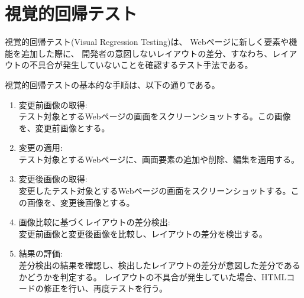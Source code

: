 \section{視覚的回帰テスト}\label{sec:vrt}
視覚的回帰テスト(Visual Regression Testing)\cite{VisualRegressionTesting}は、
Webページに新しく要素や機能を追加した際に、
開発者の意図しないレイアウトの差分、すなわち、レイアウトの不具合が発生していないことを確認するテスト手法である。
\par
視覚的回帰テストの基本的な手順は、以下の通りである。
\begin{enumerate}
      \setlength{\itemsep}{0pt}
            \setlength{\parsep}{0pt}
      \item 変更前画像の取得:\\
            テスト対象とするWebページの画面をスクリーンショットする。この画像を、変更前画像とする。
      \item 変更の適用:\\
            テスト対象とするWebページに、画面要素の追加や削除、編集を適用する。
      \item 変更後画像の取得:\\
            変更したテスト対象とするWebページの画面をスクリーンショットする。この画像を、変更後画像とする。
      \item 画像比較に基づくレイアウトの差分検出:\\
            変更前画像と変更後画像を比較し、レイアウトの差分を検出する。
      \item 結果の評価:\\
            差分検出の結果を確認し、検出したレイアウトの差分が意図した差分であるかどうかを判定する。
            レイアウトの不具合が発生していた場合、HTMLコードの修正を行い、再度テストを行う。
\end{enumerate}

